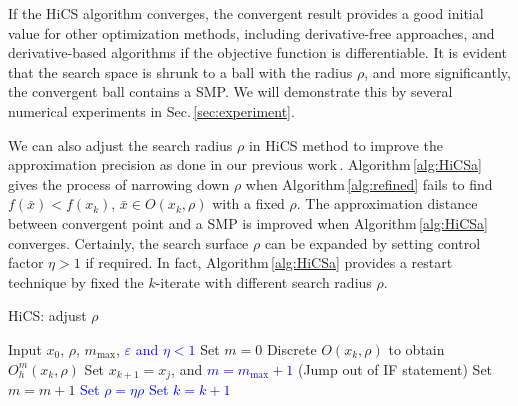\documentclass[final,1p,times]{elsarticle}
\begin{document}
If the HiCS algorithm converges, the convergent result provides a
good initial value for other optimization methods, including
derivative-free approaches, and derivative-based algorithms if the
objective function is differentiable. 
It is evident that the search space is shrunk to a ball with
the radius $\rho$, and more significantly, the convergent ball
contains a SMP.
We will demonstrate this by several numerical experiments in
Sec.\,\ref{sec:experiment}.

We can also adjust the search radius $\rho$ in HiCS method 
to improve the approximation precision as done in our previous
work\,\cite{huang2017hill}. Algorithm\,\ref{alg:HiCSa} gives the
process of narrowing down $\rho$ when Algorithm\,\ref{alg:refined} fails
to find $f(\bar{x})<f(x_k)$, $\bar{x}\in O(x_k, \rho)$ with a fixed $\rho$.
The approximation distance between convergent point and a SMP is
improved when Algorithm\,\ref{alg:HiCSa} converges.
Certainly, the search surface $\rho$ can be expanded by setting
control factor $\eta>1$ if required. 
In fact, Algorithm\,\ref{alg:HiCSa} provides a restart technique by
fixed the $k$-iterate with different search radius $\rho$.

%
%
\begin{algorithm}[H]
	\caption{HiCS: adjust $\rho$}
	\label{alg:HiCSa}
\begin{algorithmic}[1]
	\STATE Input $x_0$, $\rho$, $m_{\max}$,
	\textcolor{blue}{$\varepsilon$ and $\eta<1$}
	\IF { \textcolor{blue}{ $\rho>\varepsilon$}}
		\STATE Set $m=0$
			\STATE Discrete $O(x_k,\rho)$ to obtain $O^m_h(x_k,\rho)$
			\STATE Set $x_{k+1}=x_j$, 
				and \textcolor{blue}{$m=m_{\max}+1$} (Jump out of IF statement) 
			\ELSE
				\STATE Set $m = m+1$
			\ENDIF
		\ELSE
			\STATE \textcolor{blue}{ Set $\rho=\eta\rho$}
		\ENDIF
		\STATE \textcolor{blue}{Set $k=k+1$}
	\ENDFOR
\ENDIF
\end{algorithmic}
\end{algorithm}
\end{document}
